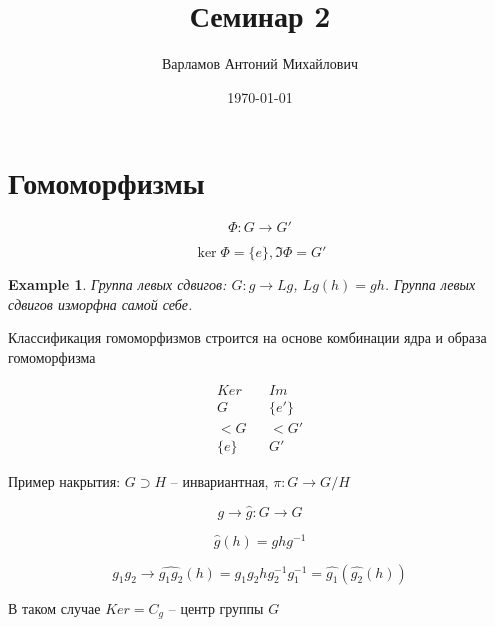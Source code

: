 \documentclass[10pt,a4paper]{article}
\title{Семинар 2}
\date{\today}
\author{Варламов Антоний Михайлович}
\newtheorem{exmpl}{Example}
\begin{document}
	\maketitle
	\tableofcontents
	
	\section{Гомоморфизмы}
	
	\begin{equation}	
		\Phi: G \rightarrow G'
	\end{equation}
	
	\begin{equation}
		\ker \Phi = \lbrace e\rbrace, \Im \Phi  = G'
	\end{equation}
	
	\begin{exmpl}
		Группа левых сдвигов: $G: g\rightarrow Lg$, $Lg\left(h\right) = gh$. 
		Группа левых сдвигов изморфна самой себе.
	\end{exmpl}
	
	Классификация гомоморфизмов строится на основе комбинации ядра и образа 
	гомоморфизма
	
	\begin{equation}
		\begin{matrix}
			Ker && Im \\
			G && \lbrace e' \rbrace \\
			<G && <G'\\
			\lbrace e \rbrace && G'
		\end{matrix}
	\end{equation}
	
	Пример накрытия: $G \supset H $ -- инвариантная, $\pi: G\rightarrow G/H$
	
	\begin{equation}
		g \rightarrow \hat{g}: G\rightarrow G
	\end{equation}
	
	\begin{equation}
		\hat{g}\left(h\right) = ghg^{-1}
	\end{equation}
	
	\begin{equation}
		g_{1}g_{2} \rightarrow \hat{g_{1}g_{2}}\left(h\right) = g_{1}g_{2}hg_{2}
		^{-1}g_{1}^{-1} = \hat{g_{1}}\left(\hat{g_{2}}\left(h\right)\right)
	\end{equation}
	
	В таком случае $Ker = C_{g}$ -- центр группы $G$
	
\end{document}

